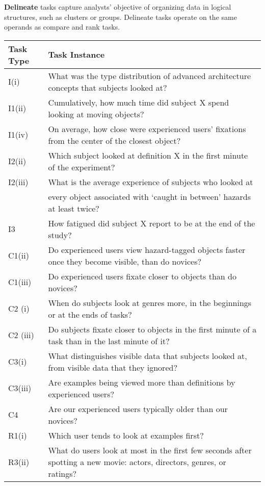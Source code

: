 \vspace{2mm}
\noindent\textbf{Delineate} tasks capture analysts' objective of organizing data in logical structures, such as clusters or groups. Delineate tasks operate on the same operands as compare and rank tasks. 

\begin{sidewaystable}
	\centering
    \begin{tabular}{|l|l|}
    \hline
    Task Type & Task Instance \\
    \hline
        I(i)& What was the type distribution of advanced architecture concepts that subjects looked at?\\
    I1(ii) &Cumulatively, how much time did subject X spend looking at moving objects?\\
    I1(iv) &On average, how close were experienced users’ fixations from the center of the closest object?\\
    I2(ii) &Which subject looked at definition X in the first minute of the experiment?\\
    I2(iii) & What is the average experience of subjects who looked at\\& every object associated with `caught in between' hazards at least twice?\\
    I3 & How fatigued did subject X report to be at the end of the study?\\
    \hline
    C1(ii) & Do experienced users view hazard-tagged objects faster once they become visible, than do novices?\\
C1(iii) & Do experienced users fixate closer to objects than do novices?\\
C2 (i) & When do subjects look at genres more, in the beginnings or at the ends of tasks?\\
C2 (iii) & Do subjects fixate closer to objects in the first minute of a task than in the last minute of it?\\
C3(i)& What distinguishes visible data that subjects looked at, from visible data that they ignored?\\
C3(iii)& Are examples being viewed more than definitions by experienced users?\\
C4 & Are our experienced users typically older than our novices?\\
    \hline
R1(i) & Which user tends to look at examples first?\\
R3(ii) & What do users look at most in the first few seconds after spotting a new movie: actors, directors, genres, or ratings?\\

\end{tabular}
\end{sidewaystable}
